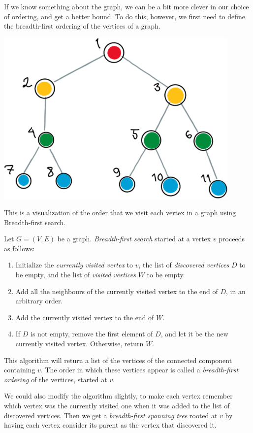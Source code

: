 \documentclass[nobib]{tufte-handout}
\begin{document}
If we know something about the graph, we can be a bit more clever in our choice of ordering, and get a better bound. To do this, however, we first need to define the breadth-first ordering of the vertices of a graph.
\begin{marginfigure}
    \centering
    \includegraphics[width=0.9\textwidth]{graphics/L12_colouring/BFS_visualization.png}
    \caption{
    This is a visualization of the order that we visit each vertex in a graph using Breadth-first search.
    }
\end{marginfigure}
\begin{definition}
  Let $G = (V,E)$ be a graph. \emph{Breadth-first search} started at a vertex $v$ proceeds as follows:
  \begin{enumerate}
    \item Initialize the \emph{currently visited vertex} to $v$, the list of \emph{discovered vertices} $D$ to be empty, and the list of \emph{visited vertices} $W$ to be empty.
    \item Add all the neighbours of the currently visited vertex to the end of $D$, in an arbitrary order.
    \item Add the currently visited vertex to the end of $W$.
    \item If $D$ is not empty, remove the first element of $D$, and let it be the new currently visited vertex. Otherwise, return $W$.
  \end{enumerate}

  This algorithm will return a list of the vertices of the connected component containing $v$. The order in which these vertices appear is called a \emph{breadth-first ordering} of the vertices, started at $v$. 
  
  We could also modify the algorithm slightly, to make each vertex remember which vertex was the currently visited one when it was added to the list of discovered vertices. Then we get a \emph{breadth-first spanning tree} rooted at $v$ by having each vertex consider its parent as the vertex that discovered it.
\end{definition}
\end{document}
